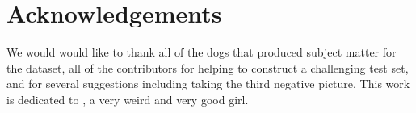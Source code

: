 \FloatBarrier
  
\ifuseacknowledgement
\section{Acknowledgements}
We would would like to thank all of the dogs that produced subject matter for the dataset, all of the
contributors for helping to construct a challenging test set, and  for several suggestions including taking the 
  third negative picture.
This work is dedicated to , a very weird and very good girl.

\fi
